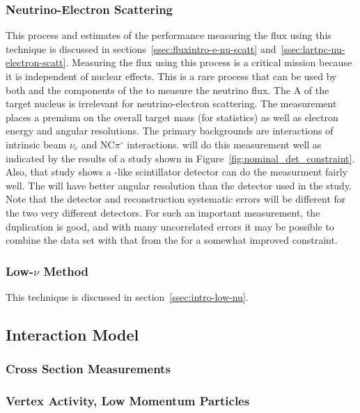 \subsubsection{Neutrino-Electron Scattering}
This process and estimates of the   performance measuring the flux using this technique is discussed in sections~\ref{ssec:fluxintro-e-nu-scatt} and~\ref{ssec:lartpc-nu-electron-scatt}.  Measuring the flux using this process is a critical  mission because it is independent of nuclear effects.  This is a rare process that can be used by both  and the  components of the  to measure the neutrino flux.  The A of the target nucleus is irrelevant for neutrino-electron scattering.  The measurement places a premium on the overall target mass (for statistics) as well as electron energy and angular resolutions.  The primary backgrounds are  interactions of intrinsic beam $\nu_{e}$ and NC$\pi^{\circ}$ interactions.   will do this measurement well as indicated by the results of a study shown in Figure~\ref{fig:nominal_det_constraint}.  Also, that study shows a -like scintillator detector can do the measurment fairly well.  The  will have better angular resolution than the detector used in the study. Note that the detector and reconstruction systematic errors will be different for the two very different detectors.  For such an important measurement, the duplication is good, and with many uncorrelated errors it may be possible to combine the  data set with that from the  for a somewhat improved constraint. 

\subsubsection{Low-$\nu$ Method}
This technique is discussed in section~\ref{ssec:intro-low-nu}.


\subsection{Interaction Model}
\subsubsection{Cross Section Measurements}
\subsubsection{Vertex Activity, Low Momentum Particles}
